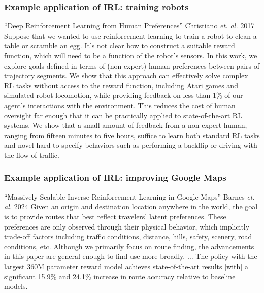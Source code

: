 \documentclass[10pt,english,t,handout]{beamer}
\begin{document}
\begin{frame} \frametitle{Example application of IRL: training robots}


\begin{block}{``Deep Reinforcement Learning from Human Preferences'' Christiano {\it et. al.\/} 2017 }
Suppose that we wanted to use reinforcement learning to train a robot to clean a table or scramble an egg. It's not clear how to construct a suitable reward function, which will need to be a function of the robot's sensors. In this work, we explore goals defined in terms of (non-expert) human preferences between pairs of trajectory segments. We show that this approach can effectively solve complex RL tasks without access to the reward function, including Atari games and simulated robot locomotion, while providing 
feedback on less than 1\% of our agent's interactions with the environment. This reduces the cost of human oversight far enough that it can be 
practically applied to state-of-the-art RL systems.  We show that a small amount of feedback 
from a non-expert human, ranging from fifteen minutes to five hours, suffice to learn both standard RL tasks and 
novel hard-to-specify behaviors such as performing a backflip or driving with the flow of traffic.
\end{block}
\end{frame}

\begin{frame} \frametitle{Example application of IRL: improving Google Maps}
\begin{block}{``Massively Scalable Inverse Reinforcement Learning in Google Maps'' Barnes {\it et. al.\/} 2024 }
Given an origin and destination location anywhere in the world, the goal is to provide routes that best reflect travelers' latent preferences. These preferences are only observed through their physical behavior, which implicitly trade-off factors including traffic conditions, distance, hills, safety, scenery, road conditions, etc. Although we primarily focus on route finding, the advancements in this paper are general enough to find use more broadly. $\ldots$ The
policy with the largest 360M parameter reward model achieves state-of-the-art results [with]
a significant 15.9\% and 24.1\% increase in route accuracy relative to baseline models.
\end{block}
\end{frame}
\end{document}
